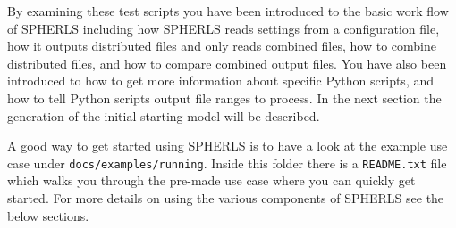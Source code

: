 \documentclass[12pt,a4paper]{book}
\begin{document}
By examining these test scripts you have been introduced to the basic work flow of SPHERLS including how SPHERLS reads settings from a configuration file, how it outputs distributed files and only reads combined files, how to combine distributed files, and how to compare combined output files. You have also been introduced to how to get more information about specific Python scripts, and how to tell Python scripts output file ranges to process. In the next section the generation of the initial starting model will be described.


A good way to get started using SPHERLS is to have a look at the example use case under {\tt docs/examples/running}. Inside this folder there is a {\tt README.txt} file which walks you through the pre-made use case where you can quickly get started. For more details on using the various components of SPHERLS see the below sections.
\end{document}
